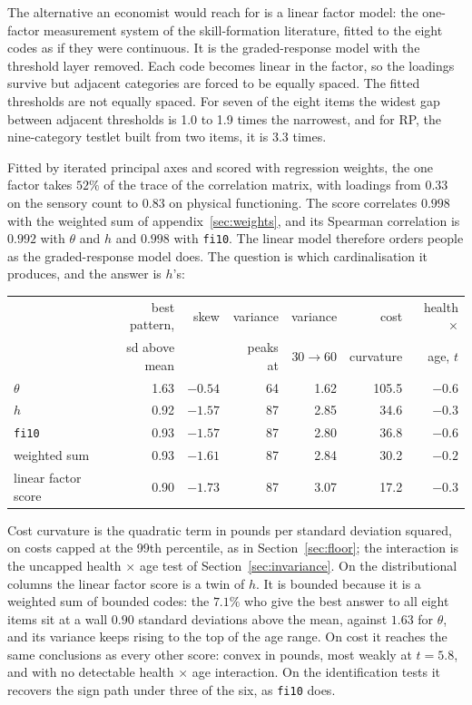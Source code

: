 \documentclass[11pt]{article}
\newcommand{\code}[1]{\texttt{\small #1}}
\begin{document}
The alternative an economist would reach for is a linear factor model: the one-factor measurement system of the skill-formation literature, fitted to the eight codes as if they were continuous. It is the graded-response model with the threshold layer removed. Each code becomes linear in the factor, so the loadings survive but adjacent categories are forced to be equally spaced. The fitted thresholds are not equally spaced. For seven of the eight items the widest gap between adjacent thresholds is 1.0 to 1.9 times the narrowest, and for RP, the nine-category testlet built from two items, it is 3.3 times.

Fitted by iterated principal axes and scored with regression weights, the one factor takes $52\%$ of the trace of the correlation matrix, with loadings from $0.33$ on the sensory count to $0.83$ on physical functioning. The score correlates $0.998$ with the weighted sum of appendix~\ref{sec:weights}, and its Spearman correlation is $0.992$ with $\theta$ and $h$ and $0.998$ with \code{fi10}. The linear model therefore orders people as the graded-response model does. The question is which cardinalisation it produces, and the answer is $h$'s:

\begin{center}\small
\begin{tabular}{lrrrrrr}
\toprule
 & best pattern, & skew & variance & variance & cost & health $\times$ \\
 & sd above mean & & peaks at & 30$\to$60 & curvature & age, $t$ \\
\midrule
$\theta$ & 1.63 & $-0.54$ & 64 & 1.62 & 105.5 & $-0.6$ \\
$h$ & 0.92 & $-1.57$ & 87 & 2.85 & 34.6 & $-0.3$ \\
\code{fi10} & 0.93 & $-1.57$ & 87 & 2.80 & 36.8 & $-0.6$ \\
weighted sum & 0.93 & $-1.61$ & 87 & 2.84 & 30.2 & $-0.2$ \\
linear factor score & 0.90 & $-1.73$ & 87 & 3.07 & 17.2 & $-0.3$ \\
\bottomrule
\end{tabular}
\end{center}

Cost curvature is the quadratic term in pounds per standard deviation squared, on costs capped at the 99th percentile, as in Section~\ref{sec:floor}; the interaction is the uncapped health $\times$ age test of Section~\ref{sec:invariance}. On the distributional columns the linear factor score is a twin of $h$. It is bounded because it is a weighted sum of bounded codes: the $7.1\%$ who give the best answer to all eight items sit at a wall $0.90$ standard deviations above the mean, against $1.63$ for $\theta$, and its variance keeps rising to the top of the age range. On cost it reaches the same conclusions as every other score: convex in pounds, most weakly at $t = 5.8$, and with no detectable health $\times$ age interaction. On the identification tests it recovers the sign path under three of the six, as \code{fi10} does.
\end{document}
